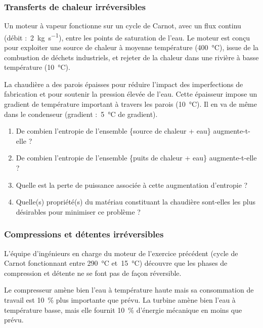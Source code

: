 \subsubsection{Transferts de chaleur irréversibles}

	Un moteur à vapeur fonctionne sur un cycle de Carnot, avec un flux continu (débit :~\SI{2}{\kilogram\per\second}), entre les points de saturation de l’eau. Le moteur est conçu pour exploiter une source de chaleur à moyenne température (\SI{400}{\degreeCelsius}), issue de la combustion de déchets industriels, et rejeter de la chaleur dans une rivière à basse température (\SI{10}{\degreeCelsius}).

	La chaudière a des parois épaisses pour réduire l’impact des imperfections de fabrication et pour soutenir la pression élevée de l’eau. Cette épaisseur impose un gradient de température important à travers les parois (\SI{10}{\degreeCelsius}). Il en va de même dans le condenseur (gradient :~\SI{5}{\degreeCelsius} de gradient).

	\begin{enumerate}
		\item De combien l’entropie de l’ensemble \{source de chaleur + eau\} augmente-t-elle ?
		\item De combien l’entropie de l’ensemble \{puits de chaleur + eau\} augmente-t-elle ?
		\item Quelle est la perte de puissance associée à cette augmentation d’entropie ?
		\item Quelle(s) propriété(s) du matériau constituant la chaudière sont-elles les plus désirables pour minimiser ce problème ?
	\end{enumerate}


\subsubsection{Compressions et détentes irréversibles}

	L’équipe d’ingénieurs en charge du moteur de l’exercice précédent (cycle de Carnot fonctionnant entre \SI{290}{\degreeCelsius} et~\SI{15}{\degreeCelsius}) découvre que les phases de compression et détente ne se font pas de façon réversible.

	Le compresseur amène bien l’eau à température haute mais sa consommation de travail est \SI{10}{\percent} plus importante que prévu. La turbine amène bien l’eau à température basse, mais elle fournit \SI{10}{\percent}  d’énergie mécanique en moins que prévu.
	
